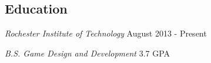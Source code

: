 \documentclass[line,margin]{res}
\begin{document}
\begin{resume}
\section{Education}
{\sl Rochester Institute of Technology} \hfill August 2013 - Present

{\sl B.S. Game Design and Development} \hfill 3.7 GPA 




\end{resume}
\end{document}
